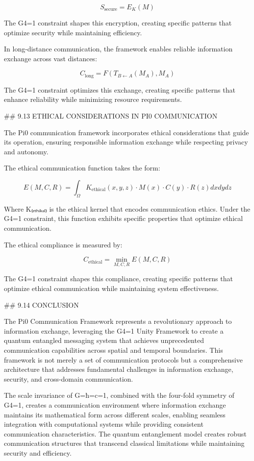 $$S_{\text{secure}} = E_K(M)$$

The G4=1 constraint shapes this encryption, creating specific patterns that optimize security while maintaining efficiency.

In long-distance communication, the framework enables reliable information exchange across vast distances:

$$C_{\text{long}} = F(T_{B \leftarrow A}(M_A), M_A)$$

The G4=1 constraint optimizes this exchange, creating specific patterns that enhance reliability while minimizing resource requirements.

## 9.13 ETHICAL CONSIDERATIONS IN PI0 COMMUNICATION

The Pi0 communication framework incorporates ethical considerations that guide its operation, ensuring responsible information exchange while respecting privacy and autonomy.

The ethical communication function takes the form:

$$E(M, C, R) = \int_{\Omega} K_{\text{ethical}}(x, y, z) \cdot M(x) \cdot C(y) \cdot R(z) dx dy dz$$

Where K₍ₑₜₕᵢₖₐₗ₎ is the ethical kernel that encodes communication ethics. Under the G4=1 constraint, this function exhibits specific properties that optimize ethical communication.

The ethical compliance is measured by:

$$C_{\text{ethical}} = \min_{M, C, R} E(M, C, R)$$

The G4=1 constraint shapes this compliance, creating specific patterns that optimize ethical communication while maintaining system effectiveness.

## 9.14 CONCLUSION

The Pi0 Communication Framework represents a revolutionary approach to information exchange, leveraging the G4=1 Unity Framework to create a quantum entangled messaging system that achieves unprecedented communication capabilities across spatial and temporal boundaries. This framework is not merely a set of communication protocols but a comprehensive architecture that addresses fundamental challenges in information exchange, security, and cross-domain communication.

The scale invariance of G=ħ=c=1, combined with the four-fold symmetry of G4=1, creates a communication environment where information exchange maintains its mathematical form across different scales, enabling seamless integration with computational systems while providing consistent communication characteristics. The quantum entanglement model creates robust communication structures that transcend classical limitations while maintaining security and efficiency.

